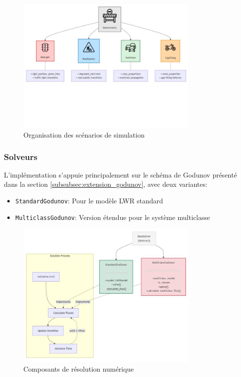 \begin{figure}[htbp]
\centering
\includegraphics[width=0.8\textwidth]{images/mermaid/scenarios}
\caption{Organisation des scénarios de simulation}
\label{fig:scenarios_structure}
\end{figure}

\subsubsection{Solveurs}
L'implémentation s'appuie principalement sur le schéma de Godunov présenté dans la section \ref{subsubsec:extension_godunov}, avec deux variantes:
\begin{itemize}
\item \texttt{StandardGodunov}: Pour le modèle LWR standard
\item \texttt{MulticlassGodunov}: Version étendue pour le système multiclasse
\end{itemize}

\begin{figure}[htbp]
\centering
\includegraphics[width=0.8\textwidth]{images/mermaid/solvers}
\caption{Composants de résolution numérique}
\label{fig:solvers_components}
\end{figure}

